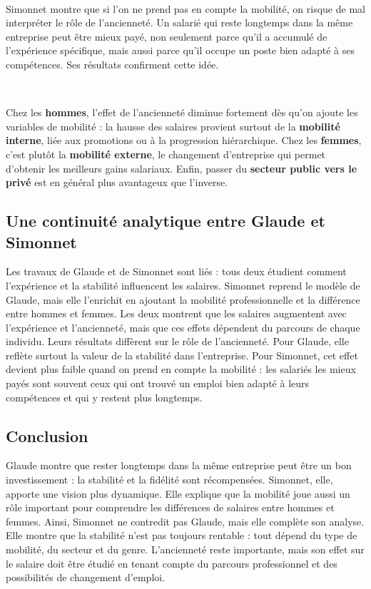 \documentclass[12pt,a4paper]{article}
\begin{document}
\

Simonnet montre que si l’on ne prend pas en compte la mobilité, on risque de mal interpréter le rôle de l’ancienneté.
Un salarié qui reste longtemps dans la même entreprise peut être mieux payé, non seulement parce qu’il a accumulé de l’expérience spécifique, mais aussi parce qu’il occupe un poste bien adapté à ses compétences. Ses résultats confirment cette idée.

\ 

Chez les \textbf{hommes}, l’effet de l’ancienneté diminue fortement dès qu’on ajoute les variables de mobilité : la hausse des salaires provient surtout de la \textbf{mobilité interne}, liée aux promotions ou à la progression hiérarchique.
Chez les \textbf{femmes}, c’est plutôt la \textbf{mobilité externe}, le changement d’entreprise qui permet d’obtenir les meilleurs gains salariaux.
Enfin, passer du \textbf{secteur public vers le privé} est en général plus avantageux que l’inverse.

\subsection{Une continuité analytique entre Glaude et Simonnet}

Les travaux de Glaude et de Simonnet sont liés : tous deux étudient comment l’expérience et la stabilité influencent les salaires.
Simonnet reprend le modèle de Glaude, mais elle l’enrichit en ajoutant la mobilité professionnelle et la différence entre hommes et femmes.
Les deux montrent que les salaires augmentent avec l’expérience et l’ancienneté, mais que ces effets dépendent du parcours de chaque individu.
Leurs résultats diffèrent sur le rôle de l’ancienneté.
Pour Glaude, elle reflète surtout la valeur de la stabilité dans l’entreprise.
Pour Simonnet, cet effet devient plus faible quand on prend en compte la mobilité : les salariés les mieux payés sont souvent ceux qui ont trouvé un emploi bien adapté à leurs compétences et qui y restent plus longtemps. 

\subsection{Conclusion}
 
Glaude montre que rester longtemps dans la même entreprise peut être un bon investissement : la stabilité et la fidélité sont récompensées.
Simonnet, elle, apporte une vision plus dynamique. Elle explique que la mobilité joue aussi un rôle important pour comprendre les différences de salaires entre hommes et femmes.
Ainsi, Simonnet ne contredit pas Glaude, mais elle complète son analyse.
Elle montre que la stabilité n’est pas toujours rentable : tout dépend du type de mobilité, du secteur et du genre.
L’ancienneté reste importante, mais son effet sur le salaire doit être étudié en tenant compte du parcours professionnel et des possibilités de changement d’emploi.
\end{document}
